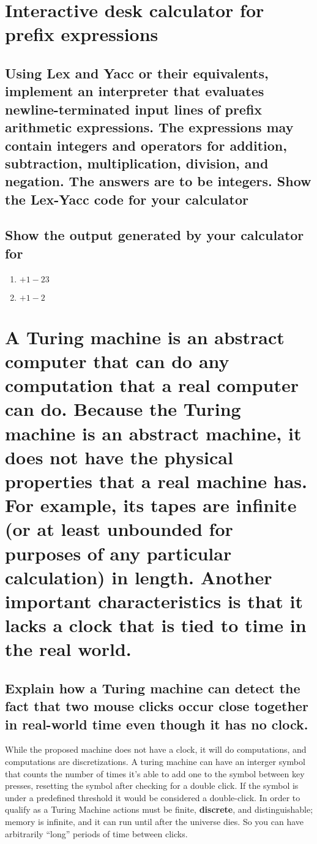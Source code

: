 \documentclass{article}
\begin{document}
\newpage
\section[Problem 4]{Interactive desk calculator for prefix expressions}
\subsection[Lex/Yac Interpreter]{Using Lex and Yacc or their equivalents, implement an interpreter that evaluates newline-terminated input lines of prefix arithmetic expressions. The expressions may contain integers and operators for addition, subtraction, multiplication, division, and negation. The answers are to be integers. Show the Lex-Yacc code for your calculator}
\subsection[Calculator Output]{Show the output generated by your calculator for}
\begin{enumerate}
    \item $+ 1 - 2 3$
    \item $+ 1 - 2$
\end{enumerate}

\newpage
\section[Problem 5]{A Turing machine is an abstract computer that can do any computation that a real computer can do. Because the Turing machine is an abstract machine, it does not have the physical properties that a real machine has. For example, its tapes are infinite (or at least unbounded for purposes of any particular calculation) in length. Another important characteristics is that it lacks a clock that is tied to time in the real world.}
\subsection[Turing Machine Double Click]{Explain how a Turing machine can detect the fact that two mouse clicks occur close together in real-world time even though it has no clock.}
While the proposed machine does not have a clock, it will do computations, and computations are discretizations. A turing machine can have an interger symbol that counts the number of times it's able to add one to the symbol between key presses, resetting the symbol after checking for a double click. If the symbol is under a predefined threshold it would be considered a double-click. In order to qualify as a Turing Machine actions must be finite, \textbf{discrete}, and distinguishable; memory is infinite, and it can run until after the universe dies. So you can have arbitrarily ``long'' periods of time between clicks.
\end{document}
